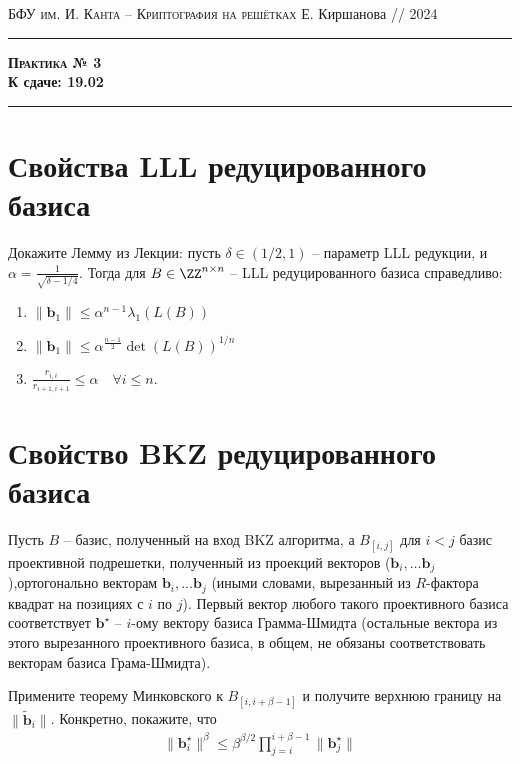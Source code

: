 \documentclass[11pt]{exam}
\theoremstyle{definition}
\renewcommand{\vec}{\mathbf}
\begin{document}
	{\noindent
		\textsc{БФУ им. И. Канта -- Криптография на решётках}
		\hfill {Е. Киршанова // 2024\\}
		\hrule
		\begin{center}
			{\Large\textbf{
					\textsc{Практика № 3}  \\[5pt]  К сдаче: 19.02
			} }
		\end{center}
		\hrule \vspace{5mm}
		
		\thispagestyle{empty}
		
		\vspace{0.2cm}
		\section{Свойства LLL редуцированного базиса}
		
		Докажите Лемму из Лекции: пусть $\delta \in (1/2, 1)$ -- параметр LLL редукции, и $\alpha = \frac{1}{\sqrt{\delta - 1/4}}$. Тогда для $B\in \ZZ^{n\times n}$ -- LLL редуцированного базиса справедливо:
		\begin{enumerate}
			\item  $\| \vec b_1 \| \leq \alpha^{n-1} \lambda_1(L(B))$
			\item  $\| \vec b_1 \| \leq \alpha^{\frac{n-1}{2}} \det(L(B))^{1/n}$
			\item $\frac{r_{i,i}}{r_{i+1, i+1}} \leq \alpha \quad \forall i \leq n$.
		\end{enumerate}


		\section{Свойство BKZ редуцированного базиса}
		
		Пусть $B$ -- базис, полученный на вход BKZ алгоритма, а $B_{[i,j]}$ для $i<j$ базис проективной подрешетки, полученный из проекций векторов ($\vec b_i, \ldots \vec b_j$),ортогонально векторам $\vec b_i, \ldots \vec b_j$ (иными словами, вырезанный из $R$-фактора квадрат на позициях с $i$ по $j$). Первый вектор любого такого проективного базиса соответствует $\vec b^{\star}$ -- $i$-ому вектору базиса Грамма-Шмидта (остальные вектора из этого вырезанного проективного базиса, в общем, не обязаны соответствовать векторам базиса Грама-Шмидта).
		\begin{questions}
		
		\question Примените теорему Минковского к $B_{[i, i+\beta-1]}$ и получите верхнюю границу на  $	\| \tilde{\vec{b}}_i \|$. Конкретно, покажите, что
		\begin{align} \label{ineq:q2}
			\| {\vec b}_i^\star \|^\beta \leq \beta^{\beta/2} \prod_{j=i}^{i+\beta - 1} \| {\vec b}^\star_j \|
		\end{align}
		

\end{questions}}
\end{document}
